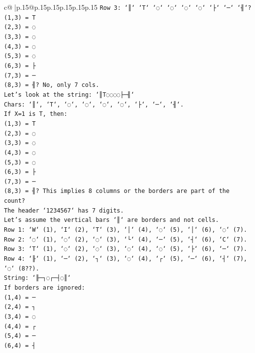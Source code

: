 \documentclass{article}
\begin{document}
{\begin{supertabular}{c@{$\;$}|p{.15\linewidth}@{}p{.15\linewidth}p{.15\linewidth}p{.15\linewidth}p{.15\linewidth}p{.15\linewidth}}
{{{\texttt{Row 3: `║` `T` `◌` `◌` `◌` `◌` `├` `─` `╢`?} \\
\texttt{(1,3) = T} \\
\texttt{(2,3) = ◌} \\
\texttt{(3,3) = ◌} \\
\texttt{(4,3) = ◌} \\
\texttt{(5,3) = ◌} \\
\texttt{(6,3) = ├} \\
\texttt{(7,3) = ─} \\
\texttt{(8,3) = ╢? No, only 7 cols.} \\
\texttt{Let's look at the string: `║T◌◌◌◌├─╢`} \\
\texttt{Chars: `║`, `T`, `◌`, `◌`, `◌`, `◌`, `├`, `─`, `╢`.} \\
\texttt{If X=1 is T, then:} \\
\texttt{(1,3) = T} \\
\texttt{(2,3) = ◌} \\
\texttt{(3,3) = ◌} \\
\texttt{(4,3) = ◌} \\
\texttt{(5,3) = ◌} \\
\texttt{(6,3) = ├} \\
\texttt{(7,3) = ─} \\
\texttt{(8,3) = ╢? This implies 8 columns or the borders are part of the count?} \\
\texttt{The header `1234567` has 7 digits.} \\
\texttt{Let's assume the vertical bars `║` are borders and not cells.} \\
\texttt{Row 1: `W` (1), `I` (2), `T` (3), `│` (4), `◌` (5), `│` (6), `◌` (7).} \\
\texttt{Row 2: `◌` (1), `◌` (2), `◌` (3), `└` (4), `─` (5), `┤` (6), `C` (7).} \\
\texttt{Row 3: `T` (1), `◌` (2), `◌` (3), `◌` (4), `◌` (5), `├` (6), `─` (7).} \\
\texttt{Row 4: `╟` (1), `─` (2), `┐` (3), `◌` (4), `┌` (5), `─` (6), `┤` (7), `◌` (8??).} \\
\texttt{String: `╟─┐◌┌─┤◌║`} \\
\texttt{If borders are ignored:} \\
\texttt{(1,4) = ─} \\
\texttt{(2,4) = ┐} \\
\texttt{(3,4) = ◌} \\
\texttt{(4,4) = ┌} \\
\texttt{(5,4) = ─} \\
\texttt{(6,4) = ┤} \\
}}}
\end{supertabular}}
\end{document}
